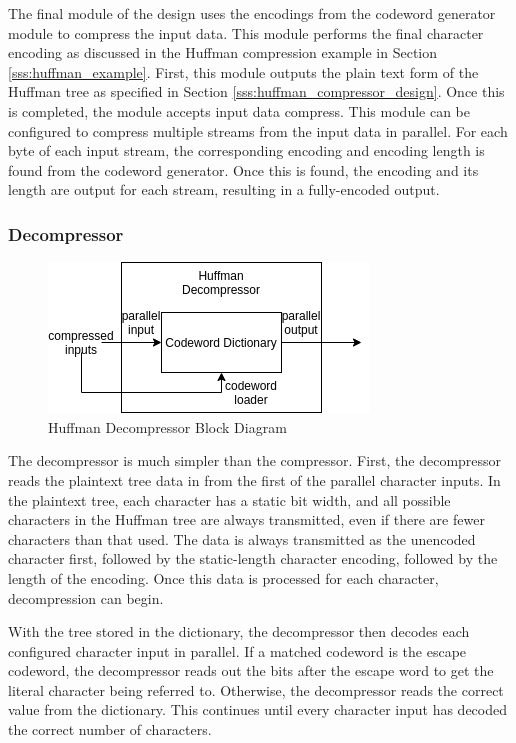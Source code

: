 \documentclass[doublespace,nopageskip]{VTthesis}
\begin{document}
The final module of the design uses the encodings from the codeword generator module to compress the input data. This module performs the final character encoding as discussed in the Huffman compression example in Section \ref{sss:huffman_example}. First, this module outputs the plain text form of the Huffman tree as specified in Section \ref{sss:huffman_compressor_design}. Once this is completed, the module accepts input data compress. This module can be configured to compress multiple streams from the input data in parallel. For each byte of each input stream, the corresponding encoding and encoding length is found from the codeword generator. Once this is found, the encoding and its length are output for each stream, resulting in a fully-encoded output.

\subsubsection{Decompressor}\label{sss:huffman_decompressor_implementation}

\begin{figure}[htb]
	\centering
	\includegraphics[scale=1]{Huffman Decompressor Block Diagram.png}
	\caption{Huffman Decompressor Block Diagram}
	\label{fig:huffman_decompressor_block_diagram}
\end{figure}

The decompressor is much simpler than the compressor. First, the decompressor reads the plaintext tree data in from the first of the parallel character inputs. In the plaintext tree, each character has a static bit width, and all possible characters in the Huffman tree are always transmitted, even if there are fewer characters than that used. The data is always transmitted as the unencoded character first, followed by the static-length character encoding, followed by the length of the encoding. Once this data is processed for each character, decompression can begin.

With the tree stored in the dictionary, the decompressor then decodes each configured character input in parallel. If a matched codeword is the escape codeword, the decompressor reads out the bits after the escape word to get the literal character being referred to. Otherwise, the decompressor reads the correct value from the dictionary. This continues until every character input has decoded the correct number of characters.
\end{document}
